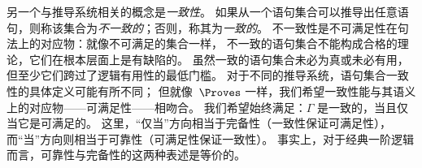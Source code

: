 \documentclass[../../../include/open-logic-section]{subfiles}
\begin{document}
另一个与推导系统相关的概念是\emph{一致性}。
如果从一个语句集合可以推导出任意语句，则称该集合为\emph{不一致的}；否则，称其为\emph{一致的}。
不一致性是不可满足性在句法上的对应物：就像不可满足的集合一样，
不一致的语句集合不能构成合格的理论，它们在根本层面上是有缺陷的。
虽然一致的语句集合未必为真或未必有用，但至少它们跨过了逻辑有用性的最低门槛。
对于不同的推导系统，语句集合一致性的具体定义可能有所不同；
但就像~$\Proves$ 一样，我们希望一致性能与其语义上的对应物——可满足性——相吻合。
我们希望始终满足：$\Gamma$ 是一致的，当且仅当它是可满足的。
这里，“仅当”方向相当于完备性（一致性保证可满足性），而“当”方向则相当于可靠性（可满足性保证一致性）。
事实上，对于经典一阶逻辑而言，可靠性与完备性的这两种表述是等价的。
\end{document}
